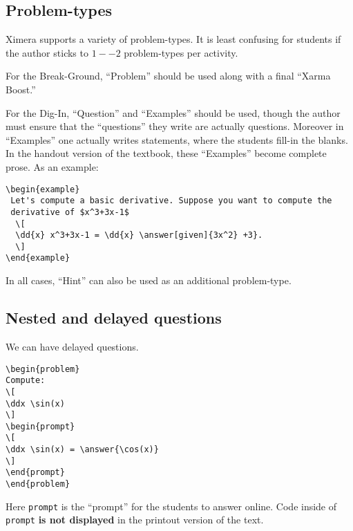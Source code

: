 \documentclass{ximera}
\begin{document}
\subsection*{Problem-types}

Ximera supports a variety of problem-types. It is least confusing for
students if the author sticks to $1--2$ problem-types per activity.



For the Break-Ground, ``Problem'' should be used along with a final ``Xarma
Boost.''



For the Dig-In, ``Question'' and ``Examples'' should be used, though
the author must ensure that the ``questions'' they write are actually
questions. Moreover in ``Examples'' one actually writes statements,
where the students fill-in the blanks. In the handout version of the
textbook, these ``Examples'' become complete prose. As an example:

\begin{verbatim}
\begin{example}
 Let's compute a basic derivative. Suppose you want to compute the
 derivative of $x^3+3x-1$
  \[
  \dd{x} x^3+3x-1 = \dd{x} \answer[given]{3x^2} +3}.
  \]
\end{example}
\end{verbatim}

In all cases, ``Hint'' can also be used as an additional problem-type.

\subsection*{Nested and delayed questions}


We can have delayed questions.

\begin{verbatim}
\begin{problem}
Compute:
\[
\ddx \sin(x)
\]
\begin{prompt}
\[
\ddx \sin(x) = \answer{\cos(x)}
\]
\end{prompt}
\end{problem}
\end{verbatim}

Here \texttt{prompt} is the ``prompt'' for the students to answer online. Code inside of \texttt{prompt} \textbf{is not displayed} in the printout version of the text. 
\end{document}
